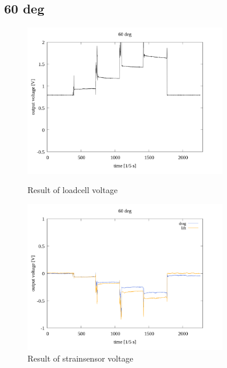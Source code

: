 \documentclass[twocolumn,a4j]{jsarticle}
\begin{document}
\subsection{60 deg}
\begin{figure}[htbp]
    \footnotesize
    \begin{center}
        \includegraphics[width=88mm]{../images/voltage-time/60_loadcell.png}
        \caption{Result of loadcell voltage}
        \includegraphics[width=88mm]{../images/voltage-time/60_strainsensor.png}
        \caption{Result of strainsensor voltage}
    \end{center}
\end{figure}

\newpage
\end{document}
